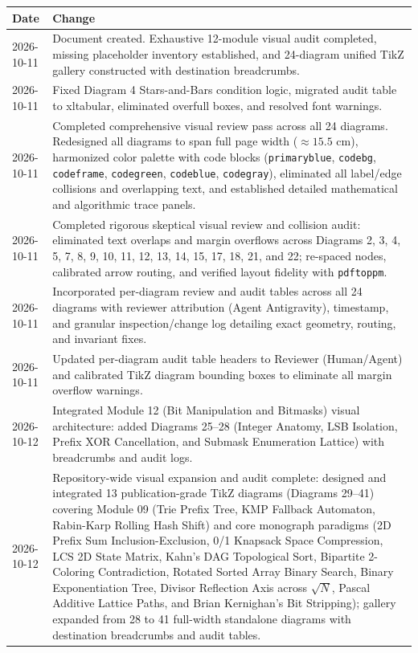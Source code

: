 \documentclass[11pt,a4paper]{article}
\begin{document}
\noindent
\begin{tabularx}{\textwidth}{|l|X|}
\hline
\textbf{Date} & \textbf{Change} \\ \hline
2026-10-11 & Document created. Exhaustive 12-module visual audit completed, missing placeholder inventory established, and 24-diagram unified TikZ gallery constructed with destination breadcrumbs. \\ \hline
2026-10-11 & Fixed Diagram 4 Stars-and-Bars condition logic, migrated audit table to xltabular, eliminated overfull boxes, and resolved font warnings. \\ \hline
2026-10-11 & Completed comprehensive visual review pass across all 24 diagrams. Redesigned all diagrams to span full page width ($\approx 15.5\text{ cm}$), harmonized color palette with code blocks (\texttt{primaryblue}, \texttt{codebg}, \texttt{codeframe}, \texttt{codegreen}, \texttt{codeblue}, \texttt{codegray}), eliminated all label/edge collisions and overlapping text, and established detailed mathematical and algorithmic trace panels. \\ \hline
2026-10-11 & Completed rigorous skeptical visual review and collision audit: eliminated text overlaps and margin overflows across Diagrams 2, 3, 4, 5, 7, 8, 9, 10, 11, 12, 13, 14, 15, 17, 18, 21, and 22; re-spaced nodes, calibrated arrow routing, and verified layout fidelity with \texttt{pdftoppm}. \\ \hline
2026-10-11 & Incorporated per-diagram review and audit tables across all 24 diagrams with reviewer attribution (Agent Antigravity), timestamp, and granular inspection/change log detailing exact geometry, routing, and invariant fixes. \\ \hline
2026-10-11 & Updated per-diagram audit table headers to Reviewer (Human/Agent) and calibrated TikZ diagram bounding boxes to eliminate all margin overflow warnings. \\ \hline
2026-10-12 & Integrated Module 12 (Bit Manipulation and Bitmasks) visual architecture: added Diagrams 25--28 (Integer Anatomy, LSB Isolation, Prefix XOR Cancellation, and Submask Enumeration Lattice) with breadcrumbs and audit logs. \\ \hline
2026-10-12 & Repository-wide visual expansion and audit complete: designed and integrated 13 publication-grade TikZ diagrams (Diagrams 29--41) covering Module 09 (Trie Prefix Tree, KMP Fallback Automaton, Rabin-Karp Rolling Hash Shift) and core monograph paradigms (2D Prefix Sum Inclusion-Exclusion, 0/1 Knapsack Space Compression, LCS 2D State Matrix, Kahn's DAG Topological Sort, Bipartite 2-Coloring Contradiction, Rotated Sorted Array Binary Search, Binary Exponentiation Tree, Divisor Reflection Axis across $\sqrt{N}$, Pascal Additive Lattice Paths, and Brian Kernighan's Bit Stripping); gallery expanded from 28 to 41 full-width standalone diagrams with destination breadcrumbs and audit tables. \\ \hline
\end{tabularx}
\end{document}
